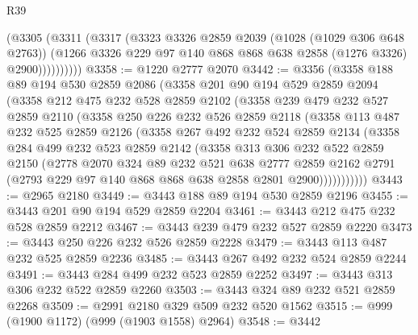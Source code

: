 \begin{lexlean}{R39}
\begin{coremodule}
              (@3305
                (@3311
                  (@3317
                    (@3323
                      @3326
                      @2859
                      @2039
                      (@1028 (@1029 @306 @648 @2763))
                      (@1266 @3326 @229 @97 @140 @868 @868 @638 @2858 (@1276 @3326) @2900))))))))))
@3358 := @1220 @2777 @2070
@3442 := @3356
    (@3358
      @188
      @89
      @194
      @530
      @2859
      @2086
      (@3358
        @201
        @90
        @194
        @529
        @2859
        @2094
        (@3358
          @212
          @475
          @232
          @528
          @2859
          @2102
          (@3358
            @239
            @479
            @232
            @527
            @2859
            @2110
            (@3358
              @250
              @226
              @232
              @526
              @2859
              @2118
              (@3358
                @113
                @487
                @232
                @525
                @2859
                @2126
                (@3358
                  @267
                  @492
                  @232
                  @524
                  @2859
                  @2134
                  (@3358
                    @284
                    @499
                    @232
                    @523
                    @2859
                    @2142
                    (@3358
                      @313
                      @306
                      @232
                      @522
                      @2859
                      @2150
                      (@2778
                        @2070
                        @324
                        @89
                        @232
                        @521
                        @638
                        @2777
                        @2859
                        @2162
                        @2791
                        (@2793 @229 @97 @140 @868 @868 @638 @2858 @2801 @2900)))))))))))
@3443 := @2965 @2180
@3449 := @3443 @188 @89 @194 @530 @2859 @2196
@3455 := @3443 @201 @90 @194 @529 @2859 @2204
@3461 := @3443 @212 @475 @232 @528 @2859 @2212
@3467 := @3443 @239 @479 @232 @527 @2859 @2220
@3473 := @3443 @250 @226 @232 @526 @2859 @2228
@3479 := @3443 @113 @487 @232 @525 @2859 @2236
@3485 := @3443 @267 @492 @232 @524 @2859 @2244
@3491 := @3443 @284 @499 @232 @523 @2859 @2252
@3497 := @3443 @313 @306 @232 @522 @2859 @2260
@3503 := @3443 @324 @89 @232 @521 @2859 @2268
@3509 := @2991 @2180 @329 @509 @232 @520 @1562
@3515 := @999 (@1900 @1172) (@999 (@1903 @1558) @2964)
@3548 := @3442

\end{coremodule}
\end{lexlean}
